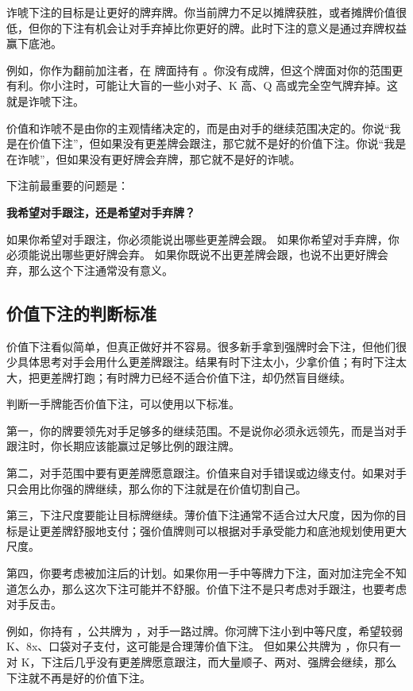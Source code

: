 诈唬下注的目标是让更好的牌弃牌。你当前牌力不足以摊牌获胜，或者摊牌价值很低，但你的下注有机会让对手弃掉比你更好的牌。此时下注的意义是通过弃牌权益赢下底池。

例如，你作为翻前加注者，在  牌面持有 。你没有成牌，但这个牌面对你的范围更有利。你小注时，可能让大盲的一些小对子、K 高、Q 高或完全空气牌弃掉。这就是诈唬下注。

价值和诈唬不是由你的主观情绪决定的，而是由对手的继续范围决定的。你说“我是在价值下注”，但如果没有更差牌会跟注，那它就不是好的价值下注。你说“我是在诈唬”，但如果没有更好牌会弃牌，那它就不是好的诈唬。

下注前最重要的问题是：

\begin{center}
\textbf{我希望对手跟注，还是希望对手弃牌？}
\end{center}

如果你希望对手跟注，你必须能说出哪些更差牌会跟。
如果你希望对手弃牌，你必须能说出哪些更好牌会弃。
如果你既说不出更差牌会跟，也说不出更好牌会弃，那么这个下注通常没有意义。

\subsection{价值下注的判断标准}

价值下注看似简单，但真正做好并不容易。很多新手拿到强牌时会下注，但他们很少具体思考对手会用什么更差牌跟注。结果有时下注太小，少拿价值；有时下注太大，把更差牌打跑；有时牌力已经不适合价值下注，却仍然盲目继续。

判断一手牌能否价值下注，可以使用以下标准。

第一，你的牌要领先对手足够多的继续范围。不是说你必须永远领先，而是当对手跟注时，你长期应该能赢过足够比例的跟注牌。

第二，对手范围中要有更差牌愿意跟注。价值来自对手错误或边缘支付。如果对手只会用比你强的牌继续，那么你的下注就是在价值切割自己。

第三，下注尺度要能让目标牌继续。薄价值下注通常不适合过大尺度，因为你的目标是让更差牌舒服地支付；强价值牌则可以根据对手承受能力和底池规划使用更大尺度。

第四，你要考虑被加注后的计划。如果你用一手中等牌力下注，面对加注完全不知道怎么办，那么这次下注可能并不舒服。价值下注不是只考虑对手跟注，也要考虑对手反击。

例如，你持有 ，公共牌为 ，对手一路过牌。你河牌下注小到中等尺度，希望较弱 K、8x、口袋对子支付，这可能是合理薄价值下注。
但如果公共牌为 ，你只有一对 K，下注后几乎没有更差牌愿意跟注，而大量顺子、两对、强牌会继续，那么下注就不再是好的价值下注。

